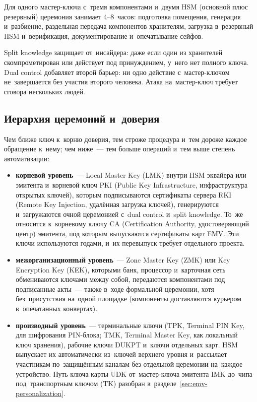 Для одного мастер-ключа с~тремя компонентами и~двумя HSM (основной плюс резервный)
церемония занимает 4--8~часов: подготовка помещения, генерация и~разбиение,
раздельная передача компонентов хранителям, загрузка в~резервный HSM
и~верификация, документирование и~опечатывание сейфов.

Split knowledge защищает от~инсайдера: даже если один из хранителей
скомпрометирован или действует под принуждением, у~него нет полного ключа. Dual
control добавляет второй барьер: ни одно действие с~мастер-ключом
не~завершается без участия второго человека. Атака на~мастер-ключ требует
сговора нескольких людей.

\subsection*{Иерархия церемоний и~доверия}

Чем ближе ключ к~корню доверия, тем строже процедура и~тем дороже каждое
обращение к~нему; чем ниже~--- тем больше операций и~тем выше степень
автоматизации:

\begin{itemize}
  \item \textbf{корневой уровень}~--- Local Master Key (LMK) внутри HSM эквайера
    или эмитента и~корневой ключ PKI (Public Key Infrastructure,
    инфраструктура открытых ключей), которым подписываются сертификаты
    сервера RKI (Remote Key Injection, удалённая загрузка ключей),
    генерируются и~загружаются очной церемонией с~dual control и~split
    knowledge. То~же относится к~корневому ключу CA (Certification
    Authority, удостоверяющий центр) эмитента, под которым выпускаются
    сертификаты карт EMV. Эти ключи используются годами, и~их перевыпуск
    требует отдельного проекта.
  \item \textbf{межорганизационный уровень}~--- Zone Master Key (ZMK) или Key
    Encryption Key (KEK), которыми банк, процессор и~карточная сеть
    обмениваются ключами между собой, передаются компонентами под
    подписанные акты~--- также в~ходе формальной церемонии, хотя
    без~присутствия на~одной площадке (компоненты доставляются курьером
    в~опечатанных конвертах).
  \item \textbf{производный уровень}~--- терминальные ключи (TPK, Terminal PIN
      Key, для шифрования PIN-блока; TMK, Terminal Master Key, как локальный
    ключ хранения), рабочие ключи DUKPT и~ключи отдельных карт. HSM выпускает их автоматически из~ключей верхнего уровня
    и~рассылает участникам по~защищённым каналам без отдельной церемонии
    на~каждое устройство. Путь ключа карты UDK от~мастер-ключа эмитента IMK
    до~чипа под~транспортным ключом (TK) разобран
    в~разделе~\ref{sec:emv-personalization}.
\end{itemize}

